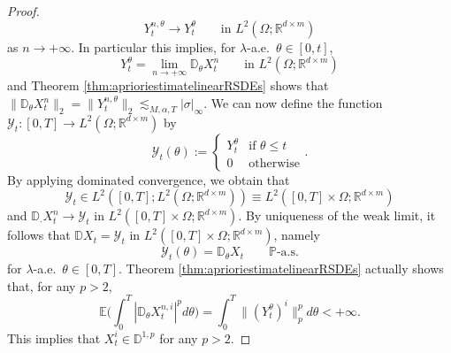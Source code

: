 \documentclass[11pt,a4paper]{article}
\newcommand{\R}{\mathbb{R}}
\newcommand{\E}{\mathbb{E}}
\theoremstyle{plain}
\begin{document}
\begin{proof}
    \begin{equation*}
        Y^{n,\theta}_t \to Y^{\theta}_t   \qquad \text{in $L^2(\Omega;\R^{d\times m})$}
    \end{equation*}
    as $n \to +\infty$. 
    In particular this implies, for $\lambda$-a.e.\ $\theta \in [0,t]$,  \begin{equation*}
        Y^\theta_t =\lim_{n \to +\infty} \mathbb{D}_\theta X^{n}_t \qquad \text{in $L^2(\Omega;\R^{d\times m})$}
    \end{equation*} and Theorem \ref{thm:aprioriestimatelinearRSDEs} shows that $\|\mathbb{D}_\theta X^{n}_t\|_{2} = \|Y^{n,\theta}_t\|_{2} \lesssim_{M,\alpha,T}  |\sigma|_\infty$.
    We can now define the function $\mathcal{Y}_t:[0,T] \to L^2(\Omega;\R^{d\times m})$ by \begin{equation*}
        \mathcal{Y}_t (\theta) := \begin{cases}
            Y_t^\theta & \text{if $\theta \le t$} \\
            0 & \text{otherwise}
        \end{cases}.
    \end{equation*}  
    By applying dominated convergence, we obtain that $$\mathcal{Y}_t \in L^2([0,T];L^2(\Omega;\R^{d\times m})) \equiv L^2([0,T]\times\Omega;\R^{d \times m})$$ and $\mathbb{D}_\cdot X^{n}_t \to \mathcal{Y}_t$ in $L^2([0,T]\times\Omega;\R^{d \times m})$.
    By uniqueness of the weak limit, it follows that $\mathbb{D}X_t = \mathcal{Y}_t$ in  $L^2([0,T]\times\Omega;\R^{d \times m})$, namely \begin{equation*}
        \mathcal{Y}_t(\theta) = \mathbb{D}_\theta X_t \qquad \text{$\mathbb{P}$-a.s.}
    \end{equation*} for $\lambda$-a.e.\ $\theta \in [0,T]$. 
    Theorem \ref{thm:aprioriestimatelinearRSDEs} actually shows that, for any $p>2$, \begin{equation*}
        \E\big(\int_0^T|\mathbb{D}_\theta X_t^{n,i}|^p d\theta\big) = \int_0^T \|(Y_t^\theta)^i\|_p^p d\theta <+\infty.
    \end{equation*} 
    This implies that $X_t^i \in \mathbb{D}^{1,p}$ for any $p > 2$.
\end{proof}
\end{document}
